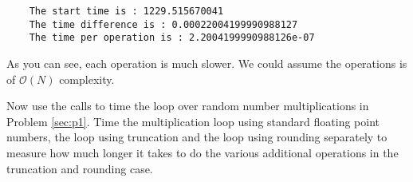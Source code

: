 \begin{verbatim}
    The start time is : 1229.515670041
    The time difference is : 0.00022004199990988127
    The time per operation is : 2.2004199990988126e-07
\end{verbatim}

As you can see, each operation is much slower. We could assume the operations is
of $\mathcal{O}(N)$ complexity.

\Question Now use the  calls to time the loop over random number
multiplications in Problem \ref{sec:p1}. Time the multiplication loop using standard
floating point numbers, the loop using truncation and the loop using rounding separately to
measure how much longer it takes to do the various additional operations in the truncation
and rounding case.


